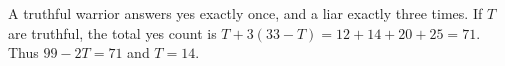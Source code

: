 A truthful warrior answers yes exactly once, and a liar exactly three times. If $T$ are truthful, the total yes count is $T+3(33-T)=12+14+20+25=71$. Thus $99-2T=71$ and $\boxed{T=14}$.
